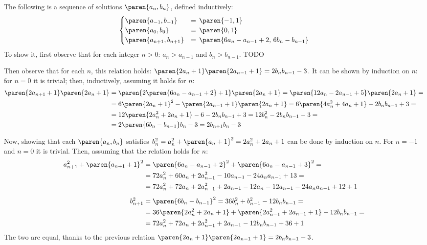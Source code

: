 The following is a sequence of solutions $\paren{a_n, b_n}$, defined inductively:
\begin{equation*}
\begin{cases}
  \paren{a_{-1},    b_{-1}}    &= \, \paren{-1, 1} \\
  \paren{a_0,       b_0}       &= \, \paren{ 0, 1} \\
  \paren{a_{n + 1}, b_{n + 1}} &= \, \paren{6 a_{n} - a_{n - 1} + 2, \, 6 b_{n} - b_{n - 1}}
\end{cases}
\end{equation*}
To show it, first observe that for each integer $n > 0$: $a_n > a_{n - 1}$ and $b_n > b_{n - 1}$.
\newline TODO

Then observe that for each $n$, this relation holds: $\paren{2 a_{n} + 1} \paren{2 a_{n - 1} + 1} = 2 b_{n} b_{n - 1} - 3$.
It can be shown by induction on $n$:
for $n = 0$ it is trivial;
then, inductively, assuming it holds for $n$:
\begin{align*}
  \paren{2 a_{n + 1} + 1} \paren{2 a_{n} + 1}
  &= \paren{2 \paren{6 a_{n} - a_{n - 1} + 2} + 1} \paren{2 a_{n} + 1}
   = \paren{12 a_{n} - 2 a_{n - 1} + 5} \paren{2 a_{n} + 1} = \\
  &= 6 \paren{2 a_{n} + 1}^2 - \paren{2 a_{n - 1} + 1} \paren{2 a_{n} + 1}
   = 6 \paren{4 a_{n}^2 + 4 a_{n} + 1} - 2 b_{n} b_{n - 1} + 3 = \\
  &= 12 \paren{2 a_{n}^2 + 2 a_{n} + 1} - 6 - 2 b_{n} b_{n - 1} + 3
   = 12 b_{n}^2 - 2 b_{n} b_{n - 1} - 3 = \\
  &= 2 \paren{6 b_{n} - b_{n - 1}} b_{n} - 3
   = 2 b_{n + 1} b_{n} - 3
\end{align*}

Now, showing that each $\paren{a_n, b_n}$
satisfies $b_{n}^{2} = a_{n}^{2} + \paren{a_{n} + 1}^2 = 2 a_{n}^{2} + 2 a_{n} + 1$
can be done by induction on $n$.
For $n = -1$ and $n = 0$ it is trivial.
Then, assuming that the relation holds for $n$:
\begin{align*}
  a_{n + 1}^{2} + \paren{a_{n + 1} + 1}^2
  &=\paren{6 a_{n} - a_{n - 1} + 2}^2 + \paren{6 a_{n} - a_{n - 1} + 3}^2 = \\
  &= 72 a_{n}^2 + 60 a_{n} + 2 a_{n - 1}^2 - 10 a_{n - 1} - 24 a_{n} a_{n - 1} + 13 = \\
  &= 72 a_{n}^2 + 72 a_{n} + 2 a_{n - 1}^2 + 2 a_{n - 1} - 12 a_{n} - 12 a_{n - 1} - 24 a_{n} a_{n - 1} + 12 + 1 \\[1ex]
  b_{n + 1}^2
  &= \paren{6 b_{n} - b_{n - 1}}^2
   = 36 b_{n}^2 + b_{n - 1}^2 - 12 b_{n} b_{n - 1} = \\
  &= 36 \paren{2 a_{n}^2 + 2 a_{n} + 1} + \paren{2 a_{n - 1}^2 + 2 a_{n - 1} + 1} - 12 b_{n} b_{n - 1} = \\
  &= 72 a_{n}^2 + 72 a_{n} + 2 a_{n - 1}^2 + 2 a_{n - 1} - 12 b_{n} b_{n - 1} + 36 + 1
\end{align*}
The two are equal, thanks to the previous relation
$\paren{2 a_{n} + 1} \paren{2 a_{n - 1} + 1} = 2 b_{n} b_{n - 1} - 3$.
